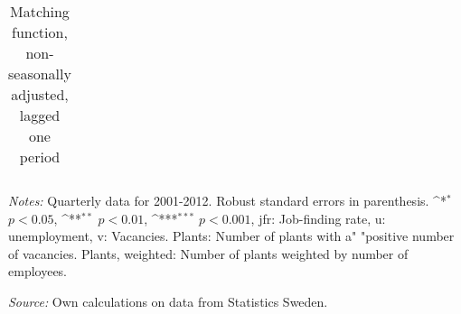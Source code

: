 \begin{table}[htbp]\centering
\def\sym#1{\ifmmode^{#1}\else\(^{#1}\)\fi}
\caption{Matching function, non-seasonally adjusted, lagged one period \label{tab:matchning_nsa_lag}}
\begin{tabular*}{1\hsize}{@{\hskip\tabcolsep\extracolsep\fill}l*{3}{c}}
\toprule





\bottomrule
\end{tabular*}
   \begin{tablenotes}[flushleft]
      \small
\item \emph{Notes:} Quarterly data for 2001-2012. Robust standard errors in parenthesis. \sym{*} \(p<0.05\), \sym{**} \(p<0.01\), \sym{***} \(p<0.001\), jfr: Job-finding rate, u: unemployment, v: Vacancies. Plants: Number of plants with a" "positive number of vacancies. Plants, weighted: Number of plants weighted by number of employees. \\
\item  \emph{Source:} Own calculations on data from Statistics Sweden.
    \end{tablenotes}
\end{table}

